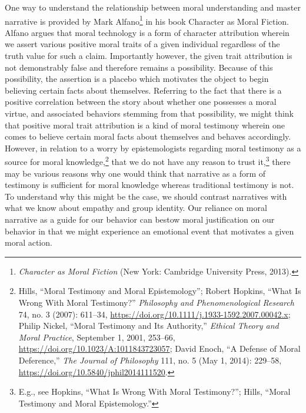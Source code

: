 \documentclass[phdthesis,12pt,final]{wuthesis}
\theoremstyle{definition}
\theoremstyle{definition}
\theoremstyle{definition}
\theoremstyle{definition}
\theoremstyle{remark}
\begin{document}
One way to understand the relationship between moral understanding and master narrative is provided by Mark Alfano\footnote{\emph{Character as Moral Fiction} (New York: Cambridge University Press, 2013).} in his book Character as Moral Fiction. Alfano argues that moral technology is a form of character attribution wherein we assert various positive moral traits of a given individual regardless of the truth value for such a claim. Importantly however, the given trait attribution is not demonstrably false and therefore remains a possibility. Because of this possibility, the assertion is a placebo which motivates the object to begin believing certain facts about themselves. Referring to the fact that there is a positive correlation between the story about whether one possesses a moral virtue, and associated behaviors stemming from that possibility, we might think that positive moral trait attribution is a kind of moral testimony wherein one comes to believe certain moral facts about themselves and behaves accordingly. However, in relation to a worry by epistemologists regarding moral testimony as a source for moral knowledge,\footnote{Hills, {``Moral Testimony and Moral Epistemology''}; Robert Hopkins, {``What {Is Wrong With Moral Testimony}?''} \emph{Philosophy and Phenomenological Research} 74, no. 3 (2007): 611--34, \url{https://doi.org/10.1111/j.1933-1592.2007.00042.x}; Philip Nickel, {``Moral {Testimony} and Its {Authority},''} \emph{Ethical Theory and Moral Practice}, September 1, 2001, 253--66, \url{https://doi.org/10.1023/A:1011843723057}; David Enoch, {``A {Defense} of {Moral Deference},''} \emph{The Journal of Philosophy} 111, no. 5 (May 1, 2014): 229--58, \url{https://doi.org/10.5840/jphil2014111520}.} that we do not have any reason to trust it,\footnote{E.g., see Hopkins, {``What {Is Wrong With Moral Testimony}?''}; Hills, {``Moral Testimony and Moral Epistemology.''}} there may be various reasons why one would think that narrative as a form of testimony is sufficient for moral knowledge whereas traditional testimony is not. To understand why this might be the case, we should contrast narratives with what we know about empathy and group identity. Our reliance on moral narrative as a guide for our behavior can bestow moral justification on our behavior in that we might experience an emotional event that motivates a given moral action.
\end{document}
